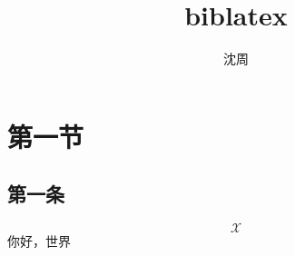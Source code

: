 \documentclass{ctexart}
\title{biblatex}
\author{沈周}
\begin{document}
\maketitle
\section{第一节}
\subsection{第一条}
\[\mathcal{X}\]\cite{latextutorial}\cite{latextutorial2}
你好，世界%
\nocite{*}
\printbibliography[title={参考文献},heading=bibintoc]
\end{document}
